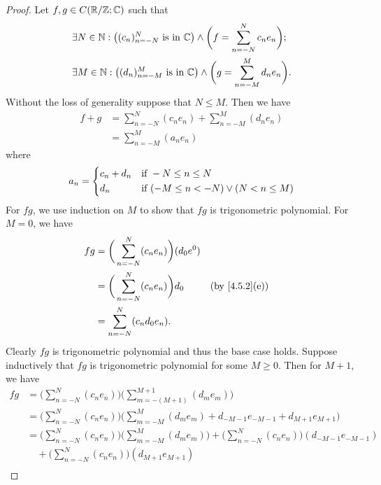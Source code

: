 \begin{proof}
  Let \(f, g \in C(\mathbb{R} / \mathbb{Z} ; \mathbb{C})\) such that
  \begin{align*}
     & \exists N \in \mathbb{N} : \big((c_n)_{n = -N}^N \text{ is in } \mathbb{C}\big) \land \bigg(f = \sum_{n = -N}^N c_n e_n\bigg); \\
     & \exists M \in \mathbb{N} : \big((d_n)_{n = -M}^M \text{ is in } \mathbb{C}\big) \land \bigg(g = \sum_{n = -M}^M d_n e_n\bigg).
  \end{align*}
  Without the loss of generality suppose that \(N \leq M\).
  Then we have
  \begin{align*}
    f + g & = \sum_{n = -N}^N (c_n e_n) + \sum_{n = -M}^M (d_n e_n) \\
          & = \sum_{n = -M}^M (a_n e_n)
  \end{align*}
  where
  \[
    a_n = \begin{dcases}
      c_n + d_n & \text{if } -N \leq n \leq N                     \\
      d_n       & \text{if } (-M \leq n < -N) \lor (N < n \leq M)
    \end{dcases}
  \]
  For \(fg\), we use induction on \(M\) to show that \(fg\) is trigonometric polynomial.
  For \(M = 0\), we have
  \begin{align*}
    fg & = \bigg(\sum_{n = -N}^N (c_n e_n)\bigg) (d_0 e^0)                                  \\
       & = \bigg(\sum_{n = -N}^N (c_n e_n)\bigg) d_0       &  & \text{(by \cref{4.5.2}(e))} \\
       & = \sum_{n = -N}^N (c_n d_0 e_n).
  \end{align*}
  Clearly \(fg\) is trigonometric polynomial and thus the base case holds.
  Suppose inductively that \(fg\) is trigonometric polynomial for some \(M \geq 0\).
  Then for \(M + 1\), we have
  \begin{align*}
    f g & = \bigg(\sum_{n = -N}^N (c_n e_n)\bigg) \bigg(\sum_{m = -(M + 1)}^{M + 1} (d_m e_m)\bigg)                                                        \\
        & = \bigg(\sum_{n = -N}^N (c_n e_n)\bigg) \bigg(\sum_{m = -M}^M (d_m e_m) + d_{-M - 1} e_{-M - 1} + d_{M + 1} e_{M + 1}\bigg)                      \\
        & = \bigg(\sum_{n = -N}^N (c_n e_n)\bigg) \bigg(\sum_{m = -M}^M (d_m e_m)\bigg) + \bigg(\sum_{n = -N}^N (c_n e_n)\bigg) (d_{-M - 1} e_{-M - 1})    \\
        & \quad + \bigg(\sum_{n = -N}^N (c_n e_n)\bigg) (d_{M + 1} e_{M + 1})                                                                              \\

\end{align*}
\end{proof}
